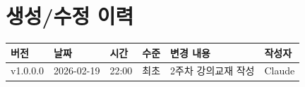 \documentclass[11pt, a4paper]{article}
\begin{document}
\section*{생성/수정 이력}

\begin{table}[H]\centering
\begin{tabular}{llllll}\toprule
\textbf{버전} & \textbf{날짜} & \textbf{시간} & \textbf{수준} & \textbf{변경 내용} & \textbf{작성자} \\\midrule
v1.0.0.0 & 2026-02-19 & 22:00 & 최초 & 2주차 강의교재 작성 & Claude \\
\bottomrule
\end{tabular}
\end{table}
\end{document}
